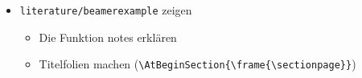 \documentclass[11pt,a4paper]{scrartcl}
\begin{document}
\begin{itemize}
\begin{itemize}
\begin{lstlisting}
\end{proof}
  \uncover<4->{The proof used \textit{reductio ad absurdum}.}
\end{frame}
    \end{lstlisting}
    \item Mit diesem Paket können ganze PDF-Seiten als Folien eingefügt werden.
    \begin{lstlisting}
\usepackage{pdfpages}
{
   \setbeamercolor{background canvas}{bg=}
   
}
    \end{lstlisting}
  \end{itemize}	
\item \verb|literature/beamerexample| zeigen
  \begin{itemize}
  \item Die Funktion notes erklären
  \item Titelfolien machen (\verb|\AtBeginSection{\frame{\sectionpage}}|)
  \end{itemize}
\end{itemize}
\end{document}
